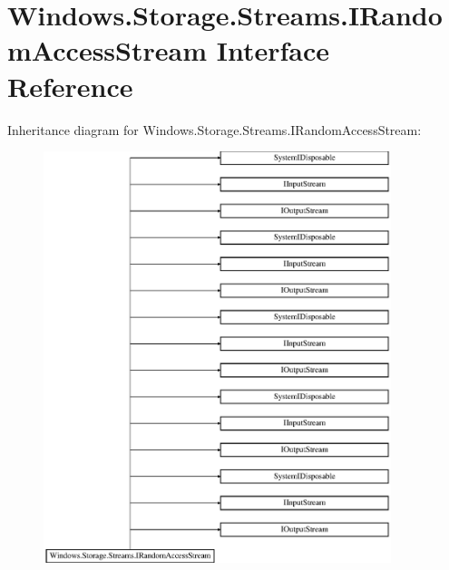 \hypertarget{interface_windows_1_1_storage_1_1_streams_1_1_i_random_access_stream}{}\section{Windows.\+Storage.\+Streams.\+I\+Random\+Access\+Stream Interface Reference}
\label{interface_windows_1_1_storage_1_1_streams_1_1_i_random_access_stream}
Inheritance diagram for Windows.\+Storage.\+Streams.\+I\+Random\+Access\+Stream\+:\begin{figure}[H]
\begin{center}
\leavevmode
\includegraphics[height=12.000000cm]{interface_windows_1_1_storage_1_1_streams_1_1_i_random_access_stream}
\end{center}
\end{figure}
